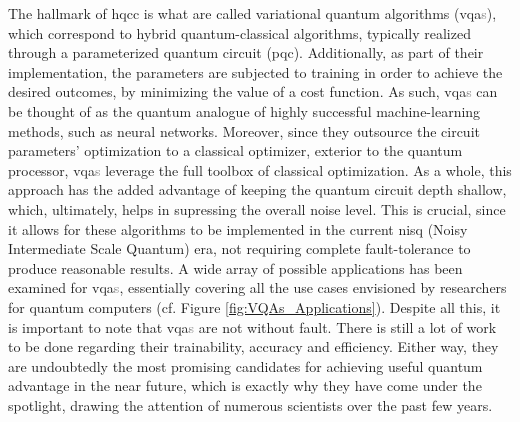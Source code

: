 


The hallmark of \acrshort{hqcc} is what are called variational quantum algorithms (\acrshort{vqa}\textcolor{gray}{s}), which correspond to hybrid quantum-classical algorithms, typically realized through a parameterized quantum circuit (\acrshort{pqc}). Additionally, as part of their implementation, the parameters are subjected to training in order to achieve the desired outcomes, by minimizing the value of a cost function. As such, \acrshort{vqa}\textcolor{gray}{s} can be thought of as the quantum analogue of highly successful machine-learning methods, such as neural networks. Moreover, since they outsource the circuit parameters' optimization to a classical optimizer, exterior to the quantum processor, \acrshort{vqa}\textcolor{gray}{s} leverage the full toolbox of classical optimization. As a whole, this approach has the added advantage of keeping the quantum circuit depth shallow, which, ultimately, helps in supressing the overall noise level. This is crucial, since it allows for these algorithms to be implemented in the current \acrshort{nisq} (Noisy Intermediate Scale Quantum) era, not requiring complete fault-tolerance to produce reasonable results. A wide array of possible applications has been examined for \acrshort{vqa}\textcolor{gray}{s}, essentially covering all the use cases envisioned by researchers for quantum computers (cf. Figure \ref{fig:VQAs_Applications}). Despite all this, it is important to note that \acrshort{vqa}\textcolor{gray}{s} are not without fault. There is still a lot of work to be done regarding their trainability, accuracy and efficiency. Either way, they are undoubtedly the most promising candidates for achieving useful quantum advantage in the near future, which is exactly why they have come under the spotlight, drawing the attention of numerous scientists over the past few years.

